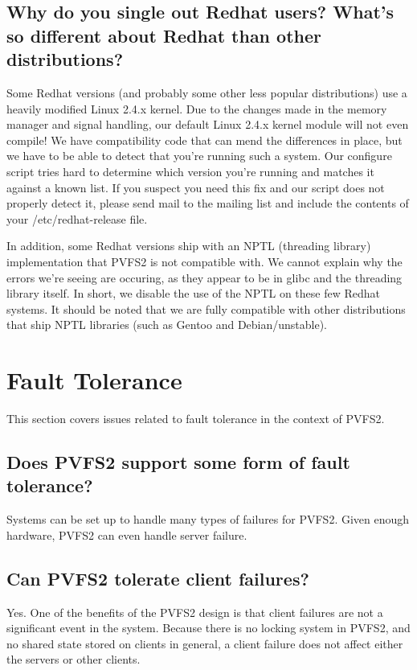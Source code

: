 \documentclass[11pt,letterpaper]{article}
\begin{document}
\subsection{Why do you single out Redhat users?  What's so different
  about Redhat than other distributions?}

Some Redhat versions (and probably some other less popular
distributions) use a heavily modified Linux 2.4.x kernel.  Due to the
changes made in the memory manager and signal handling, our default
Linux 2.4.x kernel module will not even compile!  We have
compatibility code that can mend the differences in place, but we have
to be able to detect that you're running such a system.  Our configure
script tries hard to determine which version you're running and
matches it against a known list.  If you suspect you need this fix and
our script does not properly detect it, please send mail to the
mailing list and include the contents of your /etc/redhat-release
file.

In addition, some Redhat versions ship with an NPTL (threading
library) implementation that PVFS2 is not compatible with.  We cannot
explain why the errors we're seeing are occuring, as they appear to be
in glibc and the threading library itself.  In short, we disable the
use of the NPTL on these few Redhat systems.  It should be noted that
we are fully compatible with other distributions that ship NPTL
libraries (such as Gentoo and Debian/unstable).

%
%
\section{Fault Tolerance}
\label{sec:fault-tolerance}

This section covers issues related to fault tolerance in the context of PVFS2.

\subsection{Does PVFS2 support some form of fault tolerance?}

Systems can be set up to handle many types of failures for PVFS2.  Given enough
hardware, PVFS2 can even handle server failure.

\subsection{Can PVFS2 tolerate client failures?}

Yes.  One of the benefits of the PVFS2 design is that client failures are not a
significant event in the system.  Because there is no locking system in PVFS2,
and no shared state stored on clients in general, a client failure does not
affect either the servers or other clients.
\end{document}
